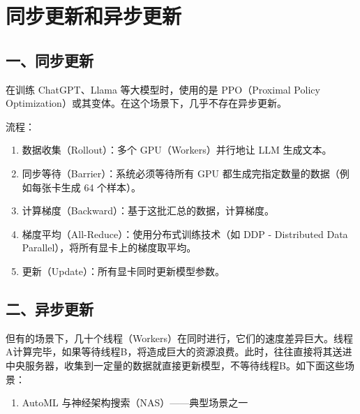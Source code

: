 \clearpage

\hypertarget{ux540cux6b65ux66f4ux65b0ux548cux5f02ux6b65ux66f4ux65b0}{%
\section{同步更新和异步更新}\label{ux540cux6b65ux66f4ux65b0ux548cux5f02ux6b65ux66f4ux65b0}}

\hypertarget{ux4e00ux540cux6b65ux66f4ux65b0}{%
\subsection{一、同步更新}\label{ux4e00ux540cux6b65ux66f4ux65b0}}

在训练 ChatGPT、Llama 等大模型时，使用的是 PPO（Proximal Policy Optimization）或其变体。在这个场景下，几乎不存在异步更新。

流程：

\begin{enumerate}
\def\labelenumi{\arabic{enumi}.}
\tightlist
\item
  数据收集（Rollout）：多个 GPU（Workers）并行地让 LLM 生成文本。
\item
  同步等待（Barrier）：系统必须等待所有 GPU 都生成完指定数量的数据（例如每张卡生成 64 个样本）。
\item
  计算梯度（Backward）：基于这批汇总的数据，计算梯度。
\item
  梯度平均（All-Reduce）：使用分布式训练技术（如 DDP - Distributed Data Parallel），将所有显卡上的梯度取平均。
\item
  更新（Update）：所有显卡同时更新模型参数。
\end{enumerate}

\hypertarget{ux4e8cux5f02ux6b65ux66f4ux65b0}{%
\subsection{二、异步更新}\label{ux4e8cux5f02ux6b65ux66f4ux65b0}}

但有的场景下，几十个线程（Workers）在同时进行，它们的速度差异巨大。线程A计算完毕，如果等待线程B，将造成巨大的资源浪费。此时，往往直接将其送进中央服务器，收集到一定量的数据就直接更新模型，不等待线程B。如下面这些场景：

\begin{enumerate}
\def\labelenumi{\arabic{enumi}.}
\tightlist
\item
  AutoML 与神经架构搜索（NAS）------典型场景之一
\end{enumerate}

